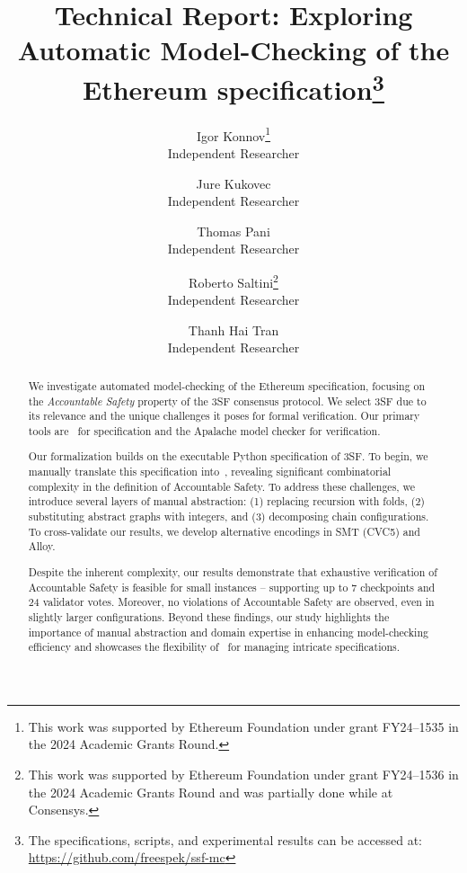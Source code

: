 \documentclass[12pt]{article}
\title{\vspace{-2em}Technical Report: Exploring Automatic Model-Checking of the Ethereum specification\footnote{%
		The specifications, scripts, and experimental results can be accessed at: \url{https://github.com/freespek/ssf-mc}}}
\author{%
    Igor Konnov\thanks{This work was supported by Ethereum Foundation
    under grant FY24--1535 in the 2024 Academic Grants Round.}\\
    \footnotesize Independent Researcher%
    \and
    Jure Kukovec\footnotemark[2] \\ \footnotesize Independent Researcher%
    \and
    Thomas Pani\footnotemark[2] \\ \footnotesize Independent Researcher%
    \and
    Roberto Saltini\thanks{This work was supported by Ethereum Foundation
    under grant FY24--1536 in the 2024 Academic Grants Round and was partially
    done while at Consensys.} \\
    \footnotesize Independent Researcher%
    \and
    Thanh Hai Tran\footnotemark[3] \\ \footnotesize Independent Researcher%
}
\date{}
\begin{document}
\maketitle

\begin{abstract}%
We investigate automated model-checking of the Ethereum specification, focusing
on the \emph{Accountable Safety} property of the 3SF consensus protocol. We
select 3SF due to its relevance and the unique challenges it poses for formal
verification. Our primary tools are~\tlap{} for specification and the Apalache
model checker for verification.

Our formalization builds on the executable Python specification of 3SF\@. To
begin, we manually translate this specification into~\tlap{}, revealing
significant combinatorial complexity in the definition of Accountable Safety.
To address these challenges, we introduce several layers of manual abstraction:
(1) replacing recursion with folds, (2) substituting abstract graphs with
integers, and (3) decomposing chain configurations.
To cross-validate our results, we develop alternative encodings in SMT (CVC5)
and Alloy.

Despite the inherent complexity, our results demonstrate that exhaustive
verification of Accountable Safety is feasible for small instances --
supporting up to 7 checkpoints and 24 validator votes. Moreover, no violations
of Accountable Safety are observed, even in slightly larger configurations.
Beyond these findings, our study highlights the importance of manual
abstraction and domain expertise in enhancing model-checking efficiency and
showcases the flexibility of~\tlap{} for managing intricate specifications.%
\end{abstract}%
\newpage%

\setcounter{tocdepth}{2}  %
\tableofcontents















\end{document}
